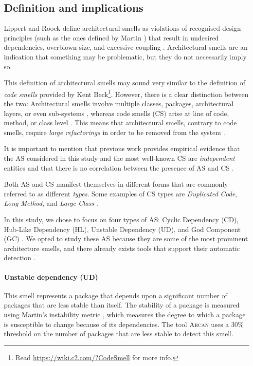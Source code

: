 \subsection{Definition and implications}
Lippert and Roock \cite{Lippert2006} define architectural smells as violations of recognised design principles (such as the ones defined by Martin \cite{Martin2018}) that result in undesired dependencies, overblown size, and excessive coupling \cite{Garcia2009}.
Architectural smells are an indication that something may be problematic, but they do not necessarily imply so.

This definition of architectural smells may sound very similar to the definition of \emph{code smells} provided by Kent Beck\footnote{Read \url{https://wiki.c2.com/?CodeSmell} for more info.}.
However, there is a clear distinction between the two: Architectural smells involve multiple classes, packages, architectural layers, or even sub-systems \cite{Lippert2006}, whereas code smells (CS) arise at line of code, method, or class level \cite{Fowler2002}.
This means that architectural smells, contrary to code smells, require \emph{large refactorings} in order to be removed from the system \cite{Lippert2006}.

It is important to mention that previous work provides empirical evidence that the AS  considered in this study and the most well-known CS are \emph{independent} entities and that there is no correlation between the presence of AS and CS \cite{Arcelli2019}.

Both AS and CS manifest themselves in different forms that are commonly referred to as different \emph{types}.
Some examples of CS types are \emph{Duplicated Code}, \emph{Long Method}, and \emph{Large Class} \cite{Fowler2002}.

In this study, we chose to focus on four types of AS: Cyclic Dependency (CD), Hub-Like Dependency (HL), Unstable Dependency (UD), and God Component (GC) \cite{Arcelli2016,Lippert2006,Sas2019}. We opted to study these AS because they are some of the most prominent architecture smells, and there already exists tools that support their automatic detection \cite{Arcelli2016, Arcelli2017}.

\paragraph{Unstable dependency (UD)}\label{c6:sec:arch-smells-ud}
This smell represents a package that depends upon a significant number of packages that are less stable than itself.
The stability of a package is measured using Martin's instability metric \cite{Martin2018}, which measures the degree to which a package is susceptible to change because of its dependencies.
The tool \textsc{Arcan} uses a 30\% threshold \cite{Arcelli2017} on the number of packages that are less stable to detect this smell.

